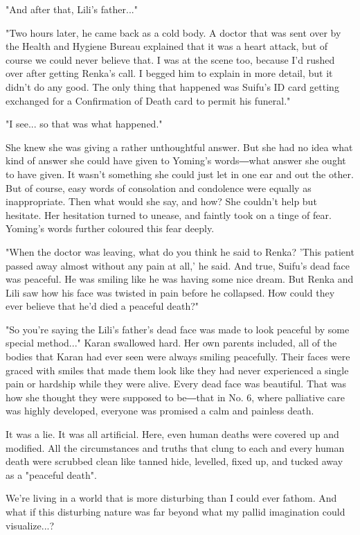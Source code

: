 "And after that, Lili's father..."

"Two hours later, he came back as a cold body. A doctor that was sent
over by the Health and Hygiene Bureau explained that it was a heart
attack, but of course we could never believe that. I was at the scene
too, because I'd rushed over after getting Renka's call. I begged him to
explain in more detail, but it didn't do any good. The only thing that
happened was Suifu's ID card getting exchanged for a Confirmation of
Death card to permit his funeral."

"I see... so that was what happened."

She knew she was giving a rather unthoughtful answer. But she had no
idea what kind of answer she could have given to Yoming's words―what
answer she ought to have given. It wasn't something she could just let
in one ear and out the other. But of course, easy words of consolation
and condolence were equally as inappropriate. Then what would she say,
and how? She couldn't help but hesitate. Her hesitation turned to
unease, and faintly took on a tinge of fear. Yoming's words further
coloured this fear deeply.

"When the doctor was leaving, what do you think he said to Renka? 'This
patient passed away almost without any pain at all,' he said. And true,
Suifu's dead face was peaceful. He was smiling like he was having some
nice dream. But Renka and Lili saw how his face was twisted in pain
before he collapsed. How could they ever believe that he'd died a
peaceful death?"

"So you're saying the Lili's father's dead face was made to look
peaceful by some special method..." Karan swallowed hard. Her own
parents included, all of the bodies that Karan had ever seen were always
smiling peacefully. Their faces were graced with smiles that made them
look like they had never experienced a single pain or hardship while
they were alive. Every dead face was beautiful. That was how she thought
they were supposed to be―that in No. 6, where palliative care was highly
developed, everyone was promised a calm and painless death.

It was a lie. It was all artificial. Here, even human deaths were
covered up and modified. All the circumstances and truths that clung to
each and every human death were scrubbed clean like tanned hide,
levelled, fixed up, and tucked away as a "peaceful death".

We're living in a world that is more disturbing than I could ever
fathom. And what if this disturbing nature was far beyond what my pallid
imagination could visualize...?

